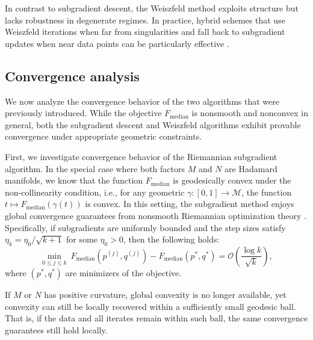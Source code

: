 \documentclass[10pt]{article}
\newcommand{\calM}{\mathcal{M}}
\begin{document}
In contrast to subgradient descent, the Weiszfeld method exploits structure but lacks robustness in degenerate regimes. In practice, hybrid schemes that use Weiszfeld iterations when far from singularities and fall back to subgradient updates when near data points can be particularly effective \cite{beck_2015_WeiszfeldsMethodOld}.

\subsection{Convergence analysis}


We now analyze the convergence behavior of the two algorithms that were previously introduced. While the objective $F_{\text{median}}$ is nonsmooth and nonconvex in general, both the subgradient descent and Weiszfeld algorithms exhibit provable convergence under appropriate geometric constraints.

First, we investigate convergence behavior of the Riemannian subgradient algorithm. In the special case where both factors $M$ and $N$ are Hadamard manifolds, we know that the function $F_{\text{median}}$ is geodesically convex under the non-collinearity condition, i.e., for any geometric $\gamma:[0,1] \to \calM$, the function $t \mapsto F_{\text{median}}(\gamma(t))$ is convex. In this setting, the subgradient method enjoys global convergence guarantees from nonsmooth Riemannian optimization theory \citep{zhang_2016_FirstorderMethodsGeodesically}. Specifically, if subgradients are uniformly bounded and the step sizes satisfy $\eta_k = \eta_0/\sqrt{k+1}$ for some $\eta_0 > 0$, then the following holds:
\begin{equation*}
\underset{0\leq j\leq k}{\min}~ F_{\text{median}}(p^{(j)}, q^{(j)}) - F_\text{median}(p^*, q^*) = \mathcal{O}\left(\frac{\log k}{\sqrt{k}}\right), 
\end{equation*}
where $(p^*, q^*)$ are minimizers of the objective. 


If $M$ or $N$ has positive curvature, global convexity is no longer available, yet convexity can still be locally recovered within a sufficiently small geodesic ball. That is, if the data and all iterates remain within such ball, the same convergence guarantees still hold locally.
\end{document}
